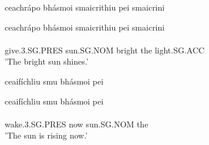 \documentclass{article}
\begin{document}
\begin{exe}
\ex \begin{ogham} ceachrápo bhásmoi smaicrithiu pei smaicrini \end{ogham}
\glll ceachrápo bhásmoi smaicrithiu pei smaicrini\\
    \\
give.3.SG.PRES sun.SG.NOM bright the light.SG.ACC\\
\trans 'The bright sun shines.'
\end{exe}
\begin{exe}
\ex \begin{ogham} ceaifíchliu smu bhásmoi pei \end{ogham}
\glll ceaifíchliu smu bhásmoi pei\\
   \\
wake.3.SG.PRES now sun.SG.NOM the\\
\trans 'The sun is rising now.'
\end{exe}
\newpage
\end{document}
